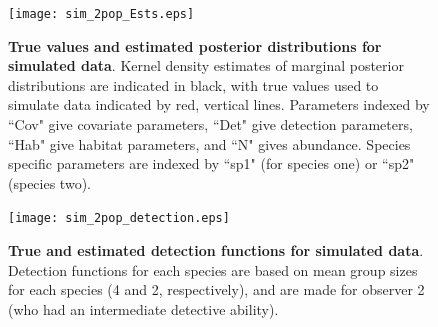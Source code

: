 \documentclass[10pt]{article}
\begin{document}
\begin{figure}
\begin{center}
\texttt{[image: sim\_2pop\_Ests.eps]}
\end{center}
\caption{{\bf True values and estimated posterior distributions for simulated data}. Kernel density estimates of marginal posterior distributions are indicated in black, with true values used to simulate data indicated by red, vertical lines.  Parameters indexed by ``Cov" give covariate parameters, ``Det" give detection parameters, ``Hab" give habitat parameters, and ``N" gives abundance.  Species specific parameters are indexed by ``sp1" (for species one) or ``sp2" (species two). }
\label{fig:sim_posts}
\end{figure}
\clearpage

\begin{figure}
\begin{center}
\texttt{[image: sim\_2pop\_detection.eps]}
\end{center}
\caption{{\bf True and estimated detection functions for simulated data}.  Detection functions for each species are based on mean group sizes for each species (4 and 2, respectively), and are made for observer 2 (who had an intermediate detective ability).}
\label{fig:sim_detection}
\end{figure}
\clearpage
\end{document}
